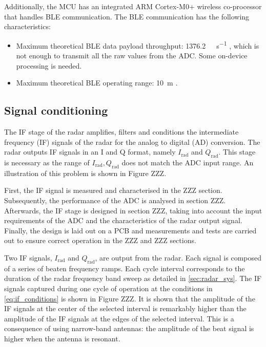 Additionally, the MCU has an integrated ARM Cortex-M0+ wireless co-processor that handles BLE communication. The BLE communication has the following characteristics:
\begin{itemize}
	\item Maximum theoretical BLE data payload throughput: \SI{1376.2}{\kilo\bit\per\second} \cite{NordicSemiconductor2019,Bluetooth52},  which is not enough to transmit all the raw values from the ADC. Some on-device processing is needed.
	\item Maximum theoretical BLE operating range: \SI{10}{\meter} \cite{Bluetooth52}.
\end{itemize}
\subsection{Signal conditioning}

The IF stage of the radar amplifies, filters and conditions the intermediate frequency (IF) signals of the radar for the analog to digital (AD) conversion. The radar outputs IF signals in an I and Q format, namely $I_\mathrm{rad}$ and $Q_\mathrm{rad}$. This stage is necessary as the range of $I_\mathrm{rad}, Q_\mathrm{rad}$ does not match the ADC input range. An illustration of this problem is shown in Figure ZZZ.


First, the IF signal is measured and characterised in the ZZZ section. Subsequently, the performance of the ADC is analysed in section ZZZ. Afterwards, the IF stage is designed in section ZZZ, taking into account the input requirements of the ADC and the characteristics of the radar output signal. Finally, the design is laid out on a PCB and measurements and tests are carried out to ensure correct operation in the ZZZ and ZZZ sections.

Two IF signals, $I_\mathrm{rad}$ and $Q_\mathrm{rad}$, are output from the radar. Each signal is composed of a series of beaten frequency ramps. Each cycle interval corresponds to the duration of the radar frequency band sweep as detailed in \cref{sec:radar_sys}. The IF signals captured during one cycle of operation at the conditions in \cref{eq:if_conditions} is shown in Figure ZZZ. It is shown that the amplitude of the IF signals at the center of the selected interval is remarkably higher than the amplitude of the IF signals at the edges of the selected interval. This is a consequence of using narrow-band antennas: the amplitude of the beat signal is higher when the antenna is resonant.

